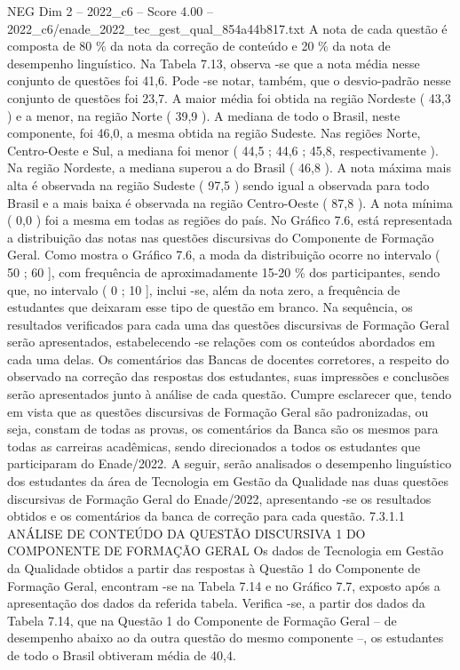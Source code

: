 \begin{textsample}{NEG Dim 2 – 2022\_c6 – Score 4.00 – 2022\_c6/enade\_2022\_tec\_gest\_qual\_854a44b817.txt}
A nota de cada questão é composta de 80 \% da nota da correção de conteúdo e 20 \% da nota de desempenho linguístico.
Na Tabela 7.13, observa -se que a nota média nesse conjunto de questões foi 41,6.
Pode -se notar, também, que o desvio-padrão nesse conjunto de questões foi 23,7.
A maior média foi obtida na região Nordeste ( 43,3 ) e a menor, na região Norte ( 39,9 ).
A mediana de todo o Brasil, neste componente, foi 46,0, a mesma obtida na região Sudeste.
Nas regiões Norte, Centro-Oeste e Sul, a mediana foi menor ( 44,5 ; 44,6 ; 45,8, respectivamente ).
Na região Nordeste, a mediana superou a do Brasil ( 46,8 ).
A nota máxima mais alta é observada na região Sudeste ( 97,5 ) sendo igual a observada para todo Brasil e a mais baixa é observada na região Centro-Oeste ( 87,8 ).
A nota mínima ( 0,0 ) foi a mesma em todas as regiões do país.
No Gráfico 7.6, está representada a distribuição das notas nas questões discursivas do Componente de Formação Geral.
Como mostra o Gráfico 7.6, a moda da distribuição ocorre no intervalo ( 50 ; 60 ], com frequência de aproximadamente 15-20 \% dos participantes, sendo que, no intervalo ( 0 ; 10 ], inclui -se, além da nota zero, a frequência de estudantes que deixaram esse tipo de questão em branco.
Na sequência, os resultados verificados para cada uma das questões discursivas de Formação Geral serão apresentados, estabelecendo -se relações com os conteúdos abordados em cada uma delas.
Os comentários das Bancas de docentes corretores, a respeito do observado na correção das respostas dos estudantes, suas impressões e conclusões serão apresentados junto à análise de cada questão.
Cumpre esclarecer que, tendo em vista que as questões discursivas de Formação Geral são padronizadas, ou seja, constam de todas as provas, os comentários da Banca são os mesmos para todas as carreiras acadêmicas, sendo direcionados a todos os estudantes que participaram do Enade/2022.
A seguir, serão analisados o desempenho linguístico dos estudantes da área de Tecnologia em Gestão da Qualidade nas duas questões discursivas de Formação Geral do Enade/2022, apresentando -se os resultados obtidos e os comentários da banca de correção para cada questão. 7.3.1.1 ANÁLISE DE CONTEÚDO DA QUESTÃO DISCURSIVA 1 DO COMPONENTE DE FORMAÇÃO GERAL Os dados de Tecnologia em Gestão da Qualidade obtidos a partir das respostas à Questão 1 do Componente de Formação Geral, encontram -se na Tabela 7.14 e no Gráfico 7.7, exposto após a apresentação dos dados da referida tabela.
Verifica -se, a partir dos dados da Tabela 7.14, que na Questão 1 do Componente de Formação Geral – de desempenho abaixo ao da outra questão do mesmo componente –, os estudantes de todo o Brasil obtiveram média de 40,4.

\end{textsample}
